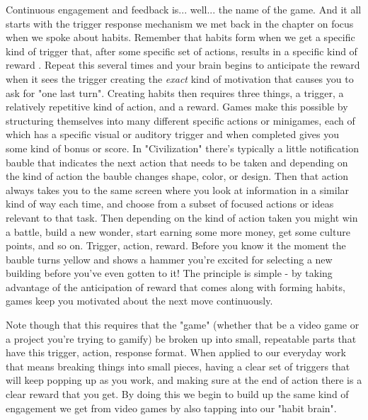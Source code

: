 \documentclass[11pt,a5paper]{book}
\begin{document}
Continuous engagement and feedback is... well... the name of the game. And it all starts with the trigger response mechanism we met back in the chapter on focus when we spoke about habits. Remember  that habits form when we get a specific kind of trigger that, after some specific set of actions, results in a specific kind of reward \cite{duhigg}. Repeat this several times and your brain begins to anticipate the reward when it sees the trigger creating the \textit{exact} kind of motivation that causes you to ask for "one last turn". Creating habits then requires three things, a trigger, a relatively repetitive kind of action, and a reward. Games make this possible by structuring themselves into many different specific actions or minigames, each of which has a specific visual or auditory trigger and when completed gives you some kind of bonus or score. In "Civilization" there's typically a little notification bauble that indicates the next action that needs to be taken and depending on the kind of action the bauble changes shape, color, or design. Then that action always takes you to the same screen where you look at information in a similar kind of way each time, and choose from a subset of focused actions or ideas relevant to that task. Then depending on the kind of action taken you might win a battle, build a new wonder, start earning some more money, get some culture points, and so on. Trigger, action, reward. Before you know it the moment the bauble turns yellow and shows a hammer you're excited for selecting a new building before you've even gotten to it! The principle is simple - by taking advantage of the anticipation of reward that comes along with forming habits, games keep you motivated about the next move continuously.  
\newline

Note though that this requires that the "game" (whether that be a video game or a project you're trying to gamify) be broken up into small, repeatable parts that have this trigger, action, response format. When applied to our everyday work that means breaking things into small pieces, having a clear set of triggers that will keep popping up as you work, and making sure at the end of action there is a clear reward that you get. By doing this we begin to build up the same kind of engagement we get from video games by also tapping into our "habit brain". 
\newline
\end{document}
